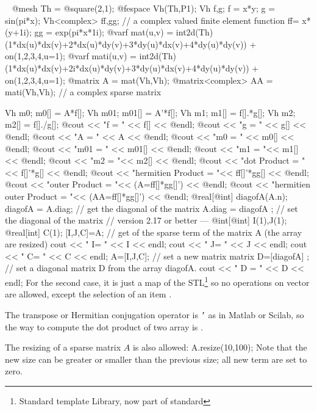 \documentclass[a4paper,twoside,12pt]{book}
\begin{document}
\begin{example}~
\bFF
@mesh Th = @square(2,1);
@fespace Vh(Th,P1);
Vh f,g;
f = x*y;
g = sin(pi*x);
Vh<complex> ff,gg; // a complex valued finite element function 
ff= x*(y+1i);
gg = exp(pi*x*1i);
@varf mat(u,v) =
  int2d(Th)(1*dx(u)*dx(v)+2*dx(u)*dy(v)+3*dy(u)*dx(v)+4*dy(u)*dy(v))
  + on(1,2,3,4,u=1);
@varf mati(u,v) =
  int2d(Th)(1*dx(u)*dx(v)+2i*dx(u)*dy(v)+3*dy(u)*dx(v)+4*dy(u)*dy(v))
  + on(1,2,3,4,u=1);
@matrix A = mat(Vh,Vh); @matrix<complex> AA = mati(Vh,Vh); // a complex sparse matrix 

Vh m0; m0[] = A*f[];
Vh m01; m01[] = A'*f[];
Vh m1; m1[] = f[].*g[];
Vh m2; m2[] = f[]./g[];
@cout << "f = " << f[] << @endl;
@cout << "g = " << g[] << @endl;
@cout << "A = " << A << @endl;
@cout << "m0 = " << m0[] << @endl;
@cout << "m01 = " << m01[] << @endl;
@cout << "m1 = "<< m1[] << @endl;
@cout << "m2 = "<< m2[] << @endl;
@cout << "dot Product = "<< f[]'*g[] << @endl;
@cout << "hermitien Product = "<< ff[]'*gg[] << @endl;
@cout << "outer Product = "<< (A=ff[]*gg[]') << @endl;
@cout << "hermitien outer Product = "<< (AA=ff[]*gg[]') << @endl;
@real[@int] diagofA(A.n);
  diagofA = A.diag; // get the diagonal of the matrix
  A.diag = diagofA ;  // set the diagonal of the matrix 
//  version 2.17 or better ---
@int[@int] I(1),J(1); @real[int] C(1);
[I,J,C]=A; // get of the sparse term of the matrix A (the array are resized)
cout << " I= " << I << endl;
cout << " J= " << J << endl;
cout << " C= " << C << endl;
A=[I,J,C]; // set a new matrix
matrix D=[diagofA] ; // set a diagonal matrix D from the array diagofA. 
cout << " D = " << D << endl;
\eFF
 For the second case, it is just
 a map of the STL\footnote{Standard template Library, now part of standard \Cpp}\cite{cpp}
 so no  operations on vector are allowed,   except the
 selection of an item  . 

The transpose or Hermitian conjugation operator is \texttt{\string'} as in  Matlab or Scilab, so the way
to compute the dot product of two array  is  .



The resizing of a sparse matrix $A$  is also allowed:
\bFF
A.resize(10,100);
\eFF
Note that the new size can be greater or smaller than the previous size; all new term are set to
zero.


\end{example}
\end{document}
